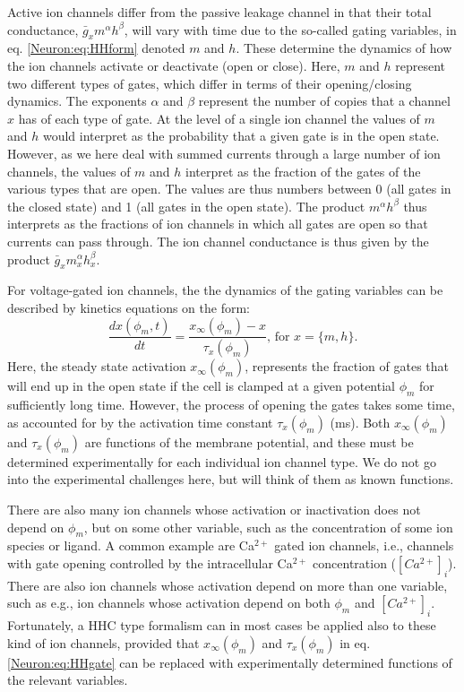 Active ion channels differ from the passive leakage channel in that their total conductance, $\bar{g}_{x} m^{\alpha} h^{\beta}$, will vary with time due to the so-called gating variables, in eq. \ref{Neuron:eq:HHform} denoted $m$ and $h$. These determine the dynamics of how the ion channels activate or deactivate (open or close). Here, $m$ and $h$ represent two different types of gates, which differ in terms of their opening/closing dynamics. The exponents $\alpha$ and $\beta$ represent the number of copies that a channel $x$ has of each type of gate. At the level of a single ion channel the values of $m$ and $h$ would interpret as the probability that a given gate is in the open state. However, as we here deal with summed currents through a large number of ion channels, the values of $m$ and $h$ interpret as the fraction of the gates of the various types that are open. The values are thus numbers between 0 (all gates in the closed state) and 1 (all gates in the open state). The product $m^{\alpha} h^{\beta}$ thus interprets as the fractions of ion channels in which all gates are open so that currents can pass through. The ion channel conductance is thus given by the product $\bar{g}_x m_x^{\alpha} h_x^{\beta}$.

For voltage-gated ion channels, the the dynamics of the gating variables can be described by kinetics equations on the form:
\begin{equation}
\frac{dx(\phi_m,t)}{dt} = \frac{x_{\infty}(\phi_m) - x}{\tau_x(\phi_m)},  \, \text{for } x = \{m,h\}.
\label{Neuron:eq:HHgate}
\end{equation}
Here, the steady state activation $x_{\infty}(\phi_m)$, represents the fraction of gates that will end up in the open state if the cell is clamped at a given potential $\phi_m$ for sufficiently long time. However, the process of opening the gates takes some time, as accounted for by the activation time constant $\tau_x(\phi_m)$ (ms). Both $x_{\infty}(\phi_m)$ and $\tau_x(\phi_m)$ are functions of the membrane potential, and these must be determined experimentally for each individual ion channel type. We do not go into the experimental challenges here, but will think of them as known functions. 

There are also many ion channels whose activation or inactivation does not depend on $\phi_m$, but on some other variable, such as the concentration of some ion species or ligand. A common example are Ca$^{2+}$ gated ion channels, i.e., channels with gate opening controlled by the intracellular Ca$^{2+}$ concentration ($[Ca^{2+}]_i$). There are also ion channels whose activation depend on more than one variable, such as e.g., ion channels whose activation depend on both $\phi_m$ and $[Ca^{2+}]_i$. Fortunately, a HHC type formalism can in most cases be applied also to these kind of ion channels, provided that $x_{\infty}(\phi_m)$ and $\tau_x(\phi_m)$ in eq. \ref{Neuron:eq:HHgate} can be replaced with experimentally determined functions of the relevant variables. 


